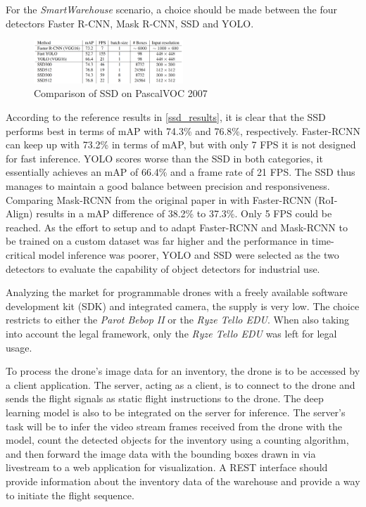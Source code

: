 \documentclass[a4paper, 10pt, journal]{wissarbIEEE}      %
\begin{document}
For the \textit{SmartWarehouse} scenario, a choice should be made between the four detectors Faster R-CNN, Mask R-CNN, SSD and YOLO. 

\begin{figure}[h]
	\centering
	\includegraphics[width=0.5\textwidth]{fig/ssd_results.png}
	\caption{Comparison of SSD on PascalVOC 2007 \cite{WeiLiuDragomirAnguelovDumitruErhanChristianSzegedyScottReedChengYangFuAlexander.2016}}
	\label{ssd_results}
\end{figure}

According to the reference results in \autoref{ssd_results}, it is clear that the SSD performs best in terms of mAP with 74.3\% and 76.8\%, respectively. Faster-RCNN can keep up with 73.2\% in terms of mAP, but with only 7 FPS it is not designed for fast inference. YOLO scores worse than the SSD in both categories, it essentially achieves an mAP of 66.4\% and a frame rate of 21 FPS. The SSD thus manages to maintain a good balance between precision and responsiveness. Comparing Mask-RCNN from the original paper in \cite{KaimingHeGeorgiaGkioxariPiotrDollarRossGirshick.2018} with Faster-RCNN (RoI-Align) results in a mAP difference of 38.2\% to 37.3\%. Only 5 FPS could be reached. As the effort to setup and to adapt Faster-RCNN and Mask-RCNN to be trained on a custom dataset was far higher and the performance in time-critical model inference was poorer, YOLO and SSD were selected as the two detectors to evaluate the capability of object detectors for industrial use.

Analyzing the market for programmable drones with a freely available software development kit (SDK) and integrated camera, the supply is very low. The choice restricts to either the \textit{Parot Bebop II} or the \textit{Ryze Tello EDU}. When also taking into account the legal framework, only the \textit{Ryze Tello EDU} was left for legal usage.

To process the drone's image data for an inventory, the drone is to be accessed by a client application. The server, acting as a client, is to connect to the drone and sends the flight signals as static flight instructions to the drone. The deep learning model is also to be integrated on the server for inference. The server's task will be to infer the video stream frames received from the drone with the model, count the detected objects for the inventory using a counting algorithm, and then forward the image data with the bounding boxes drawn in via livestream to a web application for visualization. A REST interface should provide information about the inventory data of the warehouse and provide a way to initiate the flight sequence.
\end{document}
